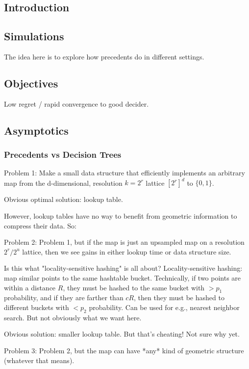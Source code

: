 \documentclass{article}
\begin{document}
\subsection{Introduction}

\subsection{Simulations}

The idea here is to explore how precedents do in different settings.

\subsection{Objectives}

Low regret / rapid convergence to good decider.

\subsection{Asymptotics}

\subsubsection{Precedents vs Decision Trees}

Problem 1: Make a small data structure that efficiently implements an arbitrary map from the d-dimensional, resolution $k = 2^r$ lattice $[2^r]^d$ to $\{0, 1\}$.

Obvious optimal solution: lookup table.

However, lookup tables have no way to benefit from geometric information to compress their data. So:

Problem 2: Problem 1, but if the map is just an upsampled map on a resolution $2^r / 2^u$ lattice, then we see gains in either lookup time or data structure size. 

Is this what "locality-sensitive hashing" is all about?
Locality-sensitive hashing: map similar points to the same hashtable bucket. Technically, if two points are within a distance $R$, they must be hashed to the same bucket with $> p_1$ probability, and if they are farther than $cR$, then they must be hashed to different buckets with $< p_2$ probability. Can be used for e.g., nearest neighbor search.
But not obviously what we want here. 

Obvious solution: smaller lookup table. But that's cheating! Not sure why yet.

Problem 3: Problem 2, but the map can have *any* kind of geometric structure (whatever that means). 
\end{document}
